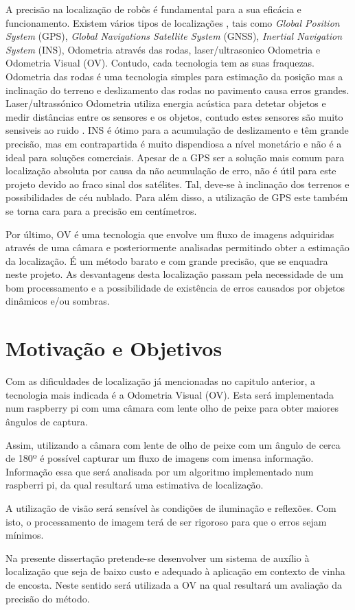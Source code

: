 A precisão na localização de robôs é fundamental para a sua eficácia e funcionamento. Existem vários tipos de localizações , tais como \textit{Global Position System} (GPS), \textit{Global Navigations Satellite System} (GNSS), \textit{Inertial Navigation System} (INS), Odometria através das rodas, laser/ultrasonico Odometria e Odometria Visual (OV). Contudo, cada tecnologia tem as suas fraquezas. Odometria das rodas é uma tecnologia simples para estimação da posição mas a inclinação do terreno e deslizamento das rodas no pavimento causa erros grandes. Laser/ultrassónico  Odometria utiliza energia acústica para detetar objetos e medir distâncias entre os sensores e os objetos, contudo estes sensores são muito sensiveis ao ruido . INS é ótimo para a acumulação de deslizamento e têm grande precisão, mas em contrapartida é muito dispendiosa a nível monetário e não é a ideal para soluções comerciais. Apesar de a GPS  ser a solução mais comum para localização absoluta por causa da não acumulação de erro, não é útil para este projeto devido ao fraco sinal dos satélites. Tal, deve-se à inclinação dos terrenos e possibilidades de céu nublado. Para além disso, a utilização de GPS este também se torna cara para a precisão em centímetros. \cite{Aqel2016}

Por último, OV é uma tecnologia que envolve um fluxo de imagens adquiridas através de uma câmara e posteriormente analisadas permitindo obter a estimação da localização. É um método barato e com grande precisão, que se enquadra neste projeto. As desvantagens desta localização passam pela necessidade de um bom processamento e a possibilidade de existência de erros causados por objetos dinâmicos e/ou sombras.

\section{Motivação e Objetivos} \label{sec:context}

Com as dificuldades de localização já mencionadas no capitulo anterior, a tecnologia mais indicada é a Odometria Visual (OV). Esta será implementada num raspberry pi com uma câmara com lente olho de peixe para obter maiores ângulos de captura.

Assim, utilizando a câmara com lente de olho de peixe com um ângulo de cerca de 180º é possível capturar um fluxo de imagens com imensa informação. Informação essa que será analisada por um algoritmo implementado num raspberri pi, da qual resultará uma estimativa de localização.

A utilização de visão será sensível às condições de iluminação e reflexões. Com isto, o processamento de imagem terá de ser rigoroso para que o erros sejam mínimos.

Na presente dissertação pretende-se desenvolver um sistema de auxílio à localização que seja de baixo custo e adequado à aplicação em contexto de vinha de encosta. Neste sentido será utilizada a OV na qual resultará um avaliação da precisão do método.
